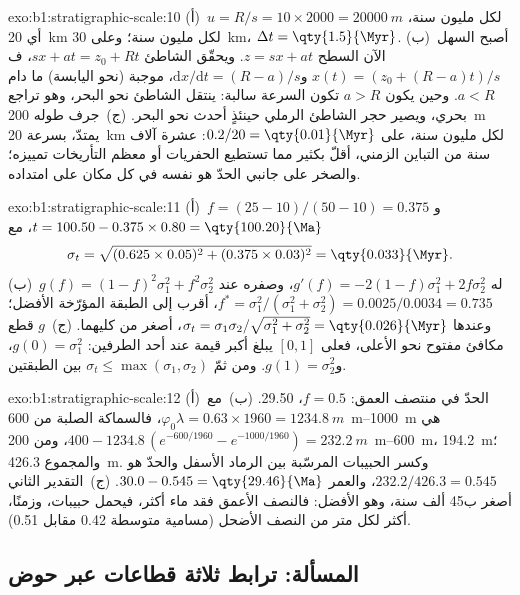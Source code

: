 \begin{solution}{exo:b1:stratigraphic-scale:10}
(أ)~$u = R/s = 10 \times 2000 = \qty{20000}{m}$ لكل مليون سنة، أي \qty{20}{km} لكل مليون سنة؛ وعلى \qty{30}{km}، $\Delta t = \qty{1.5}{\Myr}$. (ب)~أصبح السهل الآن السطح $z = s x + a t$. ويحقّق الشاطئ $s x + a t = z_0 + R t$، ف$x(t) = (z_0 + (R - a)t)/s$ و$\mathrm dx/\mathrm dt = (R - a)/s$، موجبة (نحو اليابسة) ما دام $a < R$. وحين يكون $a > R$ تكون السرعة سالبة: ينتقل الشاطئ نحو البحر، وهو تراجع بحري، ويصير حجر الشاطئ الرملي حينئذٍ أحدث نحو البحر. (ج)~جرف طوله \qty{200}{m} يمتدّ، بسرعة \qty{20}{km} لكل مليون سنة، على $0.2/20 = \qty{0.01}{\Myr}$: عشرة آلاف سنة من التباين الزمني، أقلّ بكثير مما تستطيع الحفريات أو معظم التأريخات تمييزه؛ والصخر على جانبي الحدّ هو نفسه في كل مكان على امتداده.
\end{solution}

\begin{solution}{exo:b1:stratigraphic-scale:11}
(أ)~$f = (25 - 10)/(50 - 10) = 0.375$ و$t = 100.50 - 0.375 \times 0.80 =
\qty{100.20}{\Ma}$، مع
\[
  \sigma_t = \sqrt{(0.625 \times 0.05)^2 + (0.375 \times 0.03)^2} = \qty{0.033}{\Myr}.
\] (ب)~$g(f) = (1 - f)^2\sigma_1^2 + f^2\sigma_2^2$
له $g'(f) = -2(1 - f)\sigma_1^2 + 2f\sigma_2^2$، وصفره عند $f^* =
\sigma_1^2/(\sigma_1^2 + \sigma_2^2) = 0.0025/0.0034 = 0.735$، أقرب إلى الطبقة المؤرّخة الأفضل؛ وعندها $\sigma_t = \sigma_1\sigma_2/\sqrt{\sigma_1^2 + \sigma_2^2} =
\qty{0.026}{\Myr}$، أصغر من كليهما. (ج)~$g$ قطع مكافئ مفتوح نحو الأعلى، فعلى $[0, 1]$ يبلغ أكبر قيمة عند أحد الطرفين: $g(0) = \sigma_1^2$، و$g(1) = \sigma_2^2$. ومن ثمّ $\sigma_t \le \max(\sigma_1, \sigma_2)$ بين الطبقتين.
\end{solution}

\begin{solution}{exo:b1:stratigraphic-scale:12}
(أ)~الحدّ في منتصف العمق: $f = 0.5$، \qty{29.50}{\Ma}. (ب)~مع $\varphi_0\lambda = 0.63 \times 1960 = \qty{1234.8}{m}$، فالسماكة الصلبة من \qtyrange{600}{1000}{m} هي $400 - 1234.8\,(e^{-600/1960} - e^{-1000/1960}) =
\qty{232.2}{m}$، ومن \qtyrange{200}{600}{m}، \qty{194.2}{m}؛ والمجموع \qty{426.3}{m}. وكسر الحبيبات المرسّبة بين الرماد الأسفل والحدّ هو $232.2/426.3 = 0.545$، والعمر $30.0 - 0.545 =
\qty{29.46}{\Ma}$. (ج)~التقدير الثاني أصغر ب\num{45} ألف سنة، وهو الأفضل: فالنصف الأعمق فقد ماء أكثر، فيحمل حبيبات، وزمنًا، أكثر لكل متر من النصف الأضحل (مسامية متوسطة \num{0.42} مقابل \num{0.51}).
\end{solution}

\subsection*{المسألة: ترابط ثلاثة قطاعات عبر حوض}


